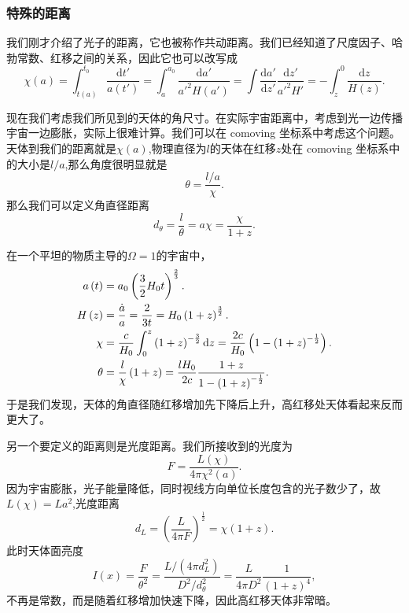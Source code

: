 \documentclass[../天体物理基础.tex]{subfiles}
\begin{document}
\subsubsection{特殊的距离}
我们刚才介绍了光子的距离，它也被称作共动距离。我们已经知道了尺度因子、哈勃常数、红移之间的关系，因此它也可以改写成
\begin{equation}
\chi\left(a\right)=\int_{t\left(a\right)}^{t_0}\frac{\mathrm{d}t'}{a\left(t'\right)}=\int_{a}^{a_{0}}\frac{\mathrm{d}a'}{a'^{2}H\left(a'\right)}=\int\frac{\mathrm{d}a'}{\mathrm{d}z'}\frac{\mathrm{d}z'}{a'^{2}H'}=-\int_{z}^{0}\frac{\mathrm{d}z}{H\left(z\right)}.
\end{equation}

现在我们考虑我们所见到的天体的角尺寸。在实际宇宙距离中，考虑到光一边传播宇宙一边膨胀，实际上很难计算。我们可以在 comoving 坐标系中考虑这个问题。天体到我们的距离就是$\chi\left(a\right)$,物理直径为$l$的天体在红移$z$处在 comoving 坐标系中的大小是$l/a$,那么角度很明显就是
\begin{equation}
\theta=\frac{l/a}{\chi}.
\end{equation}
那么我们可以定义角直径距离
\begin{equation}
d_{\theta}=\frac{l}{\theta}=a\chi=\frac{\chi}{1+z}.
\end{equation}

在一个平坦的物质主导的$\Omega=1$的宇宙中，
\begin{align}
a\left(t\right)&=a_{0}\left(\frac32H_{0}t\right)^{\frac23}.\notag\\
H\left(z\right)&=\frac{\dot a}{a}=\frac{2}{3t}=H_{0}\left(1+z\right)^{\frac32}.\notag\\
\chi&=\frac{c}{H_{0}}\int_{0}^{z}\left(1+z\right)^{-\frac32}\mathrm{d}z=\frac{2c}{H_{0}}\left(1-\left(1+z\right)^{-\frac12}\right).\notag\\
\theta&=\frac{l}{\chi}\left(1+z\right)=\frac{lH_{0}}{2c}\frac{1+z}{1-\left(1+z\right)^{-\frac12}}.
\end{align}
于是我们发现，天体的角直径随红移增加先下降后上升，高红移处天体看起来反而更大了。

另一个要定义的距离则是光度距离。我们所接收到的光度为
\begin{equation}
F=\frac{L(\chi)}{4\pi \chi^2(a)}.
\end{equation}
因为宇宙膨胀，光子能量降低，同时视线方向单位长度包含的光子数少了，故$L\left(\chi\right)=La^{2}$,光度距离
\begin{equation}
d_{L}=\left(\frac{L}{4\pi F}\right)^{\frac12}=\chi\left(1+z\right).
\end{equation}
此时天体面亮度
\begin{equation}
I(x)=\frac{F}{\theta^{2}}=\frac{L/(4\pi d_{L}^{2})}{D^{2}/d_{\theta}^{2}}=\frac{L}{4\pi D^{2}}\frac{1}{\left(1+z\right)^{4}},
\end{equation}
不再是常数，而是随着红移增加快速下降，因此高红移天体非常暗。
\end{document}
